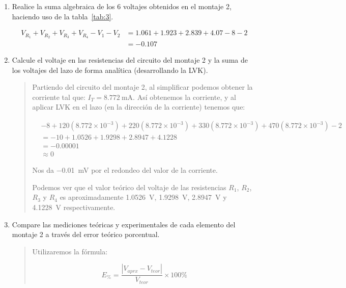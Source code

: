 \documentclass{article}
\begin{document}
\begin{enumerate}[label=\alph*.-]
        \item Realice la suma algebraica de los 6 voltajes obtenidos en el montaje 2, haciendo uso de la tabla~\ref{tab:3}.
        
        \begin{align*}
            V_{R_1} + V_{R_2} + V_{R_3} + V_{R_4} - V_1 - V_2 &= 1.061 + 1.923 + 2.839 + 4.07 - 8 - 2\\
            &= -0.107
        \end{align*}
        
        \item Calcule el voltaje en las resistencias del circuito del montaje 2 y la suma de los voltajes del lazo de forma analítica (desarrollando la LVK).
        
        \begin{quote}
            Partiendo del circuito del montaje 2, al simplificar podemos obtener la corriente tal que: $I_T = \SI{8.772}{\milli\ampere}$. Así obtenemos la corriente, y al aplicar LVK en el lazo (en la dirección de la corriente) tenemos que:
            
            \begin{align*}
                &-8 + 120 (8.772 \times 10^{-3}) + 220 (8.772 \times 10^{-3}) + 330 (8.772 \times 10^{-3}) + 470 (8.772 \times 10^{-3}) - 2\\
                &= -10 + 1.0526 + 1.9298 + 2.8947 + 4.1228\\
                &= -0.00001\\
                &\approx 0
            \end{align*}

            Nos da \SI{-0.01}{\milli\volt} por el redondeo del valor de la corriente.

            Podemos ver que el valor teórico del voltaje de las resistencias $R_1$, $R_2$, $R_3$ y $R_4$ es aproximadamente \SI{1.0526}{\volt}, \SI{1.9298}{\volt}, \SI{2.8947}{\volt} y \SI{4.1228}{\volt} respectivamente.

        \end{quote}
        
        \item Compare las mediciones teóricas y experimentales de cada elemento del montaje 2 a través del error teórico porcentual.
        
        \begin{quote}
            Utilizaremos la fórmula:

            \[
                E_{\%} = \frac{\left|V_{aprx} - V_{teor}\right|}{V_{teor}} \times 100\%
            \]


\end{quote}
\end{enumerate}
\end{document}

